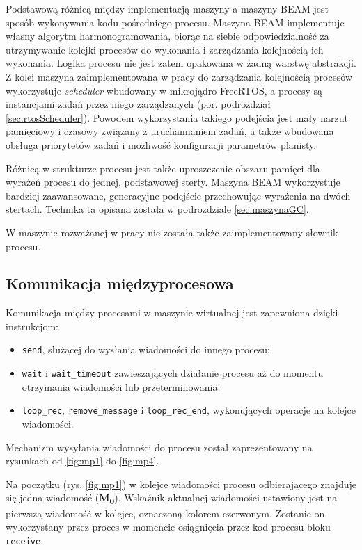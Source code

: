 Podstawową różnicą między implementacją maszyny a maszyny BEAM jest sposób wykonywania kodu pośredniego procesu.
Maszyna BEAM implementuje własny algorytm harmonogramowania, biorąc na siebie odpowiedzialność za utrzymywanie kolejki procesów do wykonania i zarządzania kolejnością ich wykonania. Logika procesu nie jest zatem opakowana w żadną warstwę abstrakcji. 
Z kolei maszyna zaimplementowana w pracy do zarządzania kolejnością procesów wykorzystuje \emph{scheduler} wbudowany w mikrojądro FreeRTOS, a procesy są instancjami zadań przez niego zarządzanych (por. podrozdział \ref{sec:rtosScheduler}).
Powodem wykorzystania takiego podejścia jest mały narzut pamięciowy i czasowy związany z uruchamianiem zadań, a także wbudowana obsługa priorytetów zadań i możliwość konfiguracji parametrów planisty.

Różnicą w strukturze procesu jest także uproszczenie obszaru pamięci dla wyrażeń procesu do jednej, podstawowej sterty. 
Maszyna BEAM wykorzystuje bardziej zaawansowane, generacyjne podejście przechowując wyrażenia na dwóch stertach.
Technika ta opisana została w podrozdziale \ref{sec:maszynaGC}.

W maszynie rozważanej w pracy nie została także zaimplementowany słownik procesu.

\subsection{Komunikacja międzyprocesowa}
\label{sub:procKolejka}

Komunikacja między procesami w maszynie wirtualnej jest zapewniona dzięki instrukcjom:
\begin{itemize}
\item \texttt{send}, służącej do wysłania wiadomości do innego procesu;
\item \texttt{wait} i \texttt{wait\_timeout} zawieszających działanie procesu aż do momentu otrzymania wiadomości lub przeterminowania;
\item \texttt{loop\_rec}, \texttt{remove\_message} i \texttt{loop\_rec\_end}, wykonujących operacje na kolejce wiadomości.
\end{itemize}

Mechanizm wysyłania wiadomości do procesu został zaprezentowany na rysunkach od \ref{fig:mp1} do \ref{fig:mp4}.

Na początku (rys. \ref{fig:mp1}) w kolejce wiadomości procesu odbierającego znajduje się jedna wiadomość (\textbf{M\textsubscript{0}}).
Wskaźnik aktualnej wiadomości ustawiony jest na pierwszą wiadomość w kolejce, oznaczoną kolorem czerwonym.
Zostanie on wykorzystany przez proces w momencie osiągnięcia przez kod procesu bloku \texttt{receive}.

